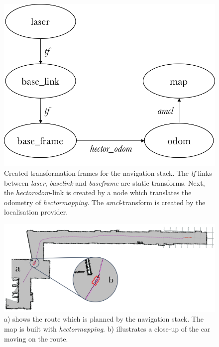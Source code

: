 \documentclass[conference,a4paper]{IEEEtran}
\begin{document}
\begin{figure}[!t]
    \includegraphics[width=\columnwidth]{navstack_tf}
    \centering
    \caption{Created transformation frames for the navigation stack. The \emph{tf}-links between \emph{laser}, \emph{base\textunderscore link} and \emph{base\textunderscore frame} are static transforms. Next, the \emph{hector\textunderscore odom}-link is created by a node which translates the odometry of \emph{hector\textunderscore mapping}. The \emph{amcl}-transform is created by the localisation provider.}
    \label{fig:navstack_tf}
\end{figure}

\begin{figure}[!t]
	\includegraphics[width=\columnwidth]{navstack_result_1}
	\centering
	\caption{a) shows the route which is planned by the navigation stack. The map is built with \emph{hector\textunderscore mapping}\cite{Kohlbrecher2012}. b) illustrates a close-up of the car moving on the route. }
	\label{fig:navstack_result}
\end{figure}
\end{document}
